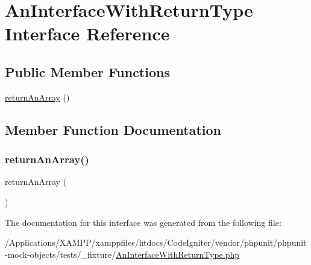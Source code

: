 \hypertarget{interface_an_interface_with_return_type}{}\section{An\+Interface\+With\+Return\+Type Interface Reference}
\label{interface_an_interface_with_return_type}
\subsection*{Public Member Functions}
\begin{DoxyCompactItemize}
\item 
\mbox{\hyperlink{interface_an_interface_with_return_type_a22e4738b79606cb647fdc978215bb2ca}{return\+An\+Array}} ()
\end{DoxyCompactItemize}


\subsection{Member Function Documentation}
\mbox{\label{interface_an_interface_with_return_type_a22e4738b79606cb647fdc978215bb2ca}} 
\subsubsection{\texorpdfstring{return\+An\+Array()}{returnAnArray()}}
{\footnotesize\ttfamily return\+An\+Array (\begin{DoxyParamCaption}{ }\end{DoxyParamCaption})}



The documentation for this interface was generated from the following file\+:\begin{DoxyCompactItemize}
\item 
/\+Applications/\+X\+A\+M\+P\+P/xamppfiles/htdocs/\+Code\+Igniter/vendor/phpunit/phpunit-\/mock-\/objects/tests/\+\_\+fixture/\mbox{\hyperlink{_an_interface_with_return_type_8php}{An\+Interface\+With\+Return\+Type.\+php}}\end{DoxyCompactItemize}
